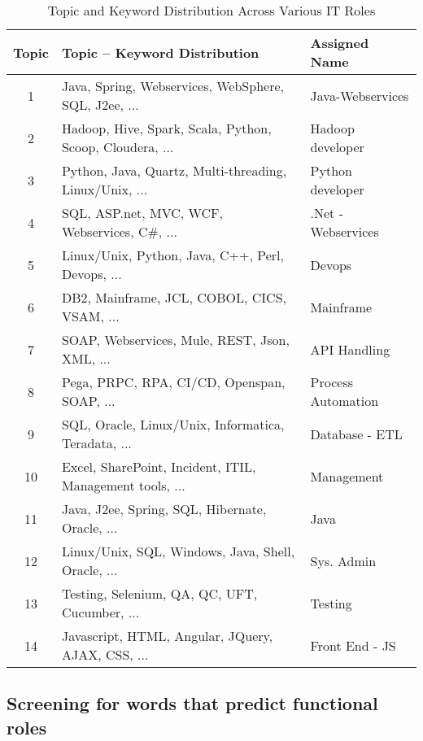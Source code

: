 \documentclass{article}
\begin{document}
\begin{table}[htbp]
\centering
\caption{Topic and Keyword Distribution Across Various IT Roles}
\label{tab:keywords}
\begin{tabular}{@{}>{\small}cll@{}} %
\toprule
\textbf{Topic} & \textbf{Topic -- Keyword Distribution} & \textbf{Assigned Name} \\
\midrule
1 & Java, Spring, Webservices, WebSphere, SQL, J2ee, ... & Java-Webservices \\
2 & Hadoop, Hive, Spark, Scala, Python, Scoop, Cloudera, ... & Hadoop developer \\
3 & Python, Java, Quartz, Multi-threading, Linux/Unix, ... & Python developer \\
4 & SQL, ASP.net, MVC, WCF, Webservices, C\#, ... & .Net - Webservices \\
5 & Linux/Unix, Python, Java, C++, Perl, Devops, ... & Devops \\
6 & DB2, Mainframe, JCL, COBOL, CICS, VSAM, ... & Mainframe \\
7 & SOAP, Webservices, Mule, REST, Json, XML, ... & API Handling \\
8 & Pega, PRPC, RPA, CI/CD, Openspan, SOAP, ... & Process Automation \\
9 & SQL, Oracle, Linux/Unix, Informatica, Teradata, ... & Database - ETL \\
10 & Excel, SharePoint, Incident, ITIL, Management tools, ... & Management \\
11 & Java, J2ee, Spring, SQL, Hibernate, Oracle, ... & Java \\
12 & Linux/Unix, SQL, Windows, Java, Shell, Oracle, ... & Sys. Admin \\
13 & Testing, Selenium, QA, QC, UFT, Cucumber, ... & Testing \\
14 & Javascript, HTML, Angular, JQuery, AJAX, CSS, ... & Front End - JS \\
\bottomrule
\end{tabular}
\end{table}



\subsection*{Screening for words that predict functional roles}
\end{document}
